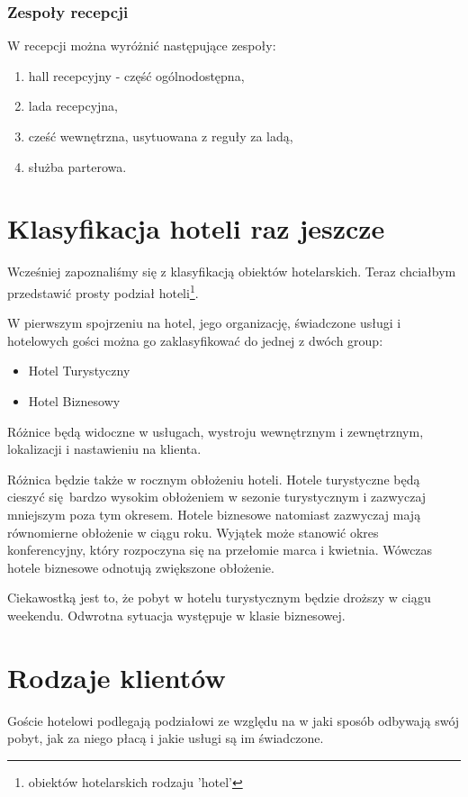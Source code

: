 \documentclass[a4paper,onecolumn,oneside,11pt,wide,floatssmall]{mwrep}
\theoremstyle{definition}
\theoremstyle{plain}%
\theoremstyle{remark}
\begin{document}
\subsubsection{Zespoły recepcji}
W recepcji można wyróżnić następujące zespoły\cite[8-10]{hotel2:part1}:
\begin{enumerate}
  \item hall recepcyjny - część ogólnodostępna,
  \item lada recepcyjna,
  \item cześć wewnętrzna, usytuowana z reguły za ladą,
  \item służba parterowa.
\end{enumerate}

\section{Klasyfikacja hoteli raz jeszcze}
Wcześniej zapoznaliśmy się z klasyfikacją obiektów hotelarskich. Teraz 
chciałbym przedstawić prosty podział hoteli\footnote{obiektów hotelarskich rodzaju 'hotel'}.

W pierwszym spojrzeniu na hotel, jego organizację, świadczone usługi i 
hotelowych gości można go zaklasyfikować do jednej z dwóch group:

\begin{itemize}
  \item Hotel Turystyczny
  \item Hotel Biznesowy
\end{itemize}

Różnice będą widoczne w usługach, wystroju wewnętrznym i zewnętrznym, 
lokalizacji i nastawieniu na klienta.

Różnica będzie także w rocznym obłożeniu hoteli. Hotele turystyczne będą 
cieszyć się bardzo wysokim obłożeniem w sezonie turystycznym i zazwyczaj 
mniejszym poza tym okresem. Hotele biznesowe natomiast zazwyczaj mają 
równomierne obłożenie w ciągu roku.
Wyjątek może stanowić okres konferencyjny, który rozpoczyna się na przełomie 
marca i kwietnia. Wówczas hotele biznesowe odnotują zwiększone obłożenie.

Ciekawostką jest to, że pobyt w hotelu turystycznym będzie droższy w ciągu 
weekendu. Odwrotna sytuacja występuje w klasie biznesowej.


\section{Rodzaje klientów}
\label{rodzaje-klientow}
Goście hotelowi podlegają podziałowi ze względu na w jaki sposób odbywają 
swój pobyt, jak za niego płacą i jakie usługi są im świadczone.
\end{document}
